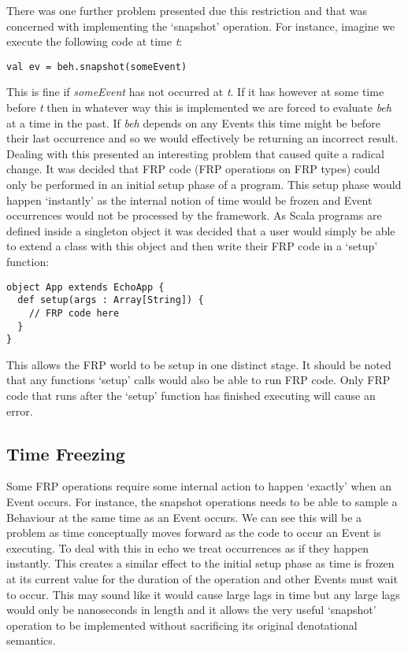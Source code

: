      There was one further problem presented due this restriction and that was concerned with
      implementing the `snapshot' operation. For instance, imagine we execute the following code
      at time \emph{t}:
      
\begin{verbatim}
val ev = beh.snapshot(someEvent)
\end{verbatim}

      This is fine if \emph{someEvent} has not occurred at \emph{t}. If it has however at some time
      before \emph{t} then in whatever way this is implemented we are forced to evaluate \emph{beh}
      at a time in the past. If \emph{beh} depends on any Events this time might be before their
      last occurrence and so we would effectively be returning an incorrect result. Dealing with this
      presented an interesting problem that caused quite a radical change. It was decided that FRP
      code (FRP operations on FRP types) could only be performed in an initial setup phase of a program.
      This setup phase would happen `instantly' as the internal notion of time would be frozen and Event
      occurrences would not be processed by the framework. As Scala programs are defined inside a singleton
      object it was decided that a user would simply be able to extend a class with this object and then
      write their FRP code in a `setup' function:
 
\begin{verbatim}
object App extends EchoApp {
  def setup(args : Array[String]) {
    // FRP code here
  }
}
\end{verbatim}

      This allows the FRP world to be setup in one distinct stage. It should be noted that
      any functions `setup' calls would also be able to run FRP code. Only FRP code that runs
      after the `setup' function has finished executing will cause an error.
      
    \subsection{Time Freezing}
      Some FRP operations require some internal action to happen `exactly' when an Event occurs. For instance,
      the snapshot operations needs to be able to sample a Behaviour at the same time as an Event occurs.
      We can see this will be a problem as time conceptually moves forward as the code to
      occur an Event is executing. To deal with this in echo we treat occurrences as if they happen instantly. This
      creates a similar effect to the initial setup phase as time is frozen at its current value for the duration
      of the operation and other Events must wait to occur. This may sound like it would cause large lags in time
      but any large lags would only be nanoseconds in length and it allows the very useful `snapshot' operation
      to be implemented without sacrificing its original denotational semantics.
    
